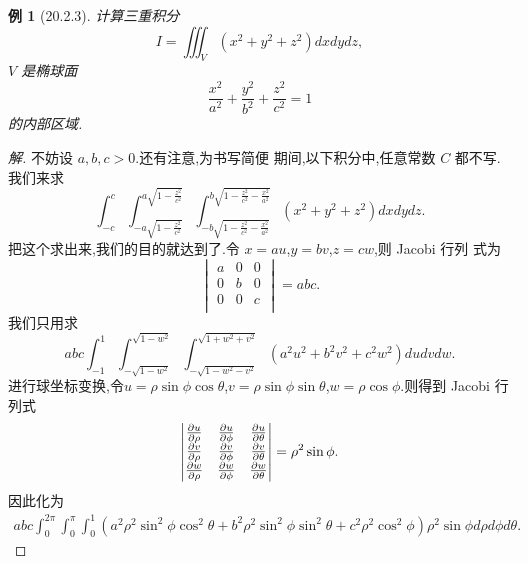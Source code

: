 \documentclass[a4paper, 12pt]{article} %
\newtheorem*{pdtheorem}{例}
\newenvironment{example}
{\bigskip\begin{mdframed}[backgroundcolor=gray!40,rightline=false,leftline=false,topline=false,bottomline=false]\begin{pdtheorem}}
    {\end{pdtheorem}\end{mdframed}\bigskip}
\begin{document}
\begin{CJK}{UTF8}{gkai}
  \begin{example}[20.2.3]
计算三重积分
$$
I=\iiint_V(x^2+y^2+z^2)dxdydz,
$$
$V$ 是椭球面
$$
\frac{x^2}{a^2}+\frac{y^2}{b^2}+\frac{z^2}{c^2}=1
$$
的内部区域.
\end{example}
\begin{proof}[解]
不妨设 $a,b,c>0$.还有注意,为书写简便
期间,以下积分中,任意常数 $C$ 都不写.我们来求
$$
\int_{-c}^c\int_{-a \sqrt{1-\frac{z^2}{c^2}}}^{a
  \sqrt{1-\frac{z^2}{c^2}}}\int_{-b
  \sqrt{1-\frac{z^2}{c^2}-\frac{x^2}{a^2}}}^{b
  \sqrt{1-\frac{z^2}{c^2}-\frac{x^2}{a^2}}}(x^2+y^2+z^2)dxdydz.
$$
把这个求出来,我们的目的就达到了.令 $x=au$,$y=bv$,$z=cw$,则 Jacobi 行列
式为
$$
\begin{vmatrix}
  a&0&0\\
0&b&0\\
0&0&c\\
\end{vmatrix}=abc.
$$
我们只用求
$$
abc\int_{-1}^1\int_{-\sqrt{1-w^2}}^{\sqrt{1-w^2}}\int_{-\sqrt{1-w^2-v^2}}^{\sqrt{1+w^2+v^2}}(a^2u^2+b^2v^2+c^2w^2)dudvdw.
$$
进行球坐标变换,令$u=\rho\sin\phi\cos\theta$,$v=\rho\sin\phi\sin\theta$,$w=\rho\cos\phi$.则得到 Jacobi 行列式
$$
\begin{vmatrix}
 \frac{\partial u}{\partial\rho}&\frac{\partial u}{\partial \phi}&\frac{\partial u}{\partial \theta}
 \\
 \frac{\partial v}{\partial\rho}&\frac{\partial v}{\partial \phi}&\frac{\partial v}{\partial \theta}
 \\
 \frac{\partial w}{\partial\rho}&\frac{\partial w}{\partial \phi}&\frac{\partial w}{\partial \theta} \\
\end{vmatrix}=\rho^2\sin\phi.
$$
因此化为
\begin{align*}
abc\int_0^{2\pi}\int_0^{\pi}\int_0^1(a^2\rho^2\sin^2\phi\cos^2\theta+b^2\rho^2\sin^2\phi\sin^2\theta+c^2\rho^2\cos^2\phi)\rho^2\sin\phi
d\rho
d\phi d\theta.
\end{align*}


\end{proof}
\end{CJK}
\end{document}
